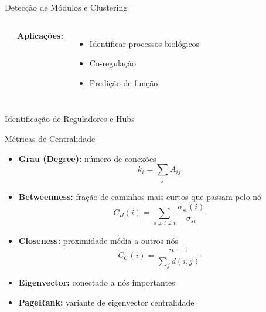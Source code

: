 \begin{frame}{Detecção de Módulos e Clustering}
\begin{columns}
\begin{center}
\end{center}

\textbf{Aplicações:}
\begin{itemize}
    \item Identificar processos biológicos
    \item Co-regulação
    \item Predição de função
\end{itemize}
\end{columns}

\vspace{0.3cm}

\end{frame}

\begin{frame}{Identificação de Reguladores e Hubs}
\begin{block}{Métricas de Centralidade}
\begin{itemize}
    \item \textbf{Grau (Degree):} número de conexões
    \begin{equation*}
    k_i = \sum_j A_{ij}
    \end{equation*}

    \item \textbf{Betweenness:} fração de caminhos mais curtos que passam pelo nó
    \begin{equation*}
    C_B(i) = \sum_{s \neq i \neq t} \frac{\sigma_{st}(i)}{\sigma_{st}}
    \end{equation*}

    \item \textbf{Closeness:} proximidade média a outros nós
    \begin{equation*}
    C_C(i) = \frac{n-1}{\sum_j d(i,j)}
    \end{equation*}

    \item \textbf{Eigenvector:} conectado a nós importantes
    \item \textbf{PageRank:} variante de eigenvector centralidade
\end{itemize}
\end{block}
\end{frame}

